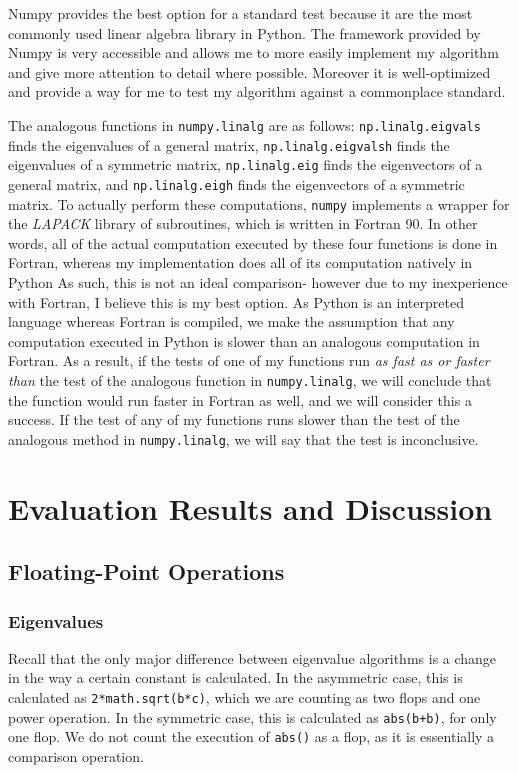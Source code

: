 \documentclass[10pt,twocolumn]{article}
\begin{document}
Numpy provides the best option for a standard test because it are the most commonly used linear algebra library in Python. The framework provided by Numpy is very accessible and allows me to more easily implement my algorithm and give more attention to detail where possible. Moreover it is well-optimized and provide a way for me to test my algorithm against a commonplace standard.

The analogous functions in \verb|numpy.linalg| are as follows: \verb|np.linalg.eigvals| finds the eigenvalues of a general matrix, \verb|np.linalg.eigvalsh| finds the eigenvalues of a symmetric matrix, \verb|np.linalg.eig| finds the eigenvectors of a general matrix, and \verb|np.linalg.eigh| finds the eigenvectors of a symmetric matrix. To actually perform these computations, \verb|numpy| implements a wrapper for the \textit{LAPACK} library of subroutines, which is written in Fortran 90. \cite{np.LA} In other words, all of the actual computation executed by these four functions is done in Fortran, whereas my implementation does all of its computation natively in Python As such, this is not an ideal comparison- however due to my inexperience with Fortran, I believe this is my best option. As Python is an interpreted language whereas Fortran is compiled, we make the assumption that any computation executed in Python is slower than an analogous computation in Fortran. As a result, if the tests of one of my functions run \textit{as fast as or faster than} the test of the analogous function in \verb|numpy.linalg|, we will conclude that the function would run faster in Fortran as well, and we will consider this a success. If the test of any of my functions runs slower than the test of the analogous method in \verb|numpy.linalg|, we will say that the test is inconclusive.

\section{Evaluation Results and Discussion}

\subsection{Floating-Point Operations}

\subsubsection{Eigenvalues}

Recall that the only major difference between eigenvalue algorithms is a change in the way a certain constant is calculated. In the asymmetric case, this is calculated as \verb|2*math.sqrt(b*c)|, which we are counting as two flops and one power operation. In the symmetric case, this is calculated as \verb|abs(b+b)|, for only one flop. We do not count the execution of \verb|abs()| as a flop, as it is essentially a comparison operation. \cite{Gray_2017}
\end{document}
